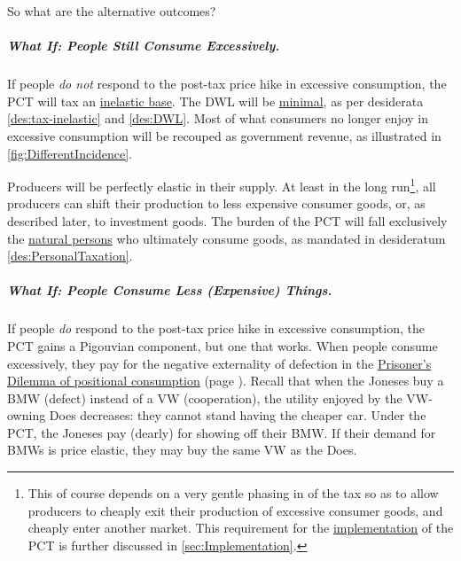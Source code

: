 So what are the alternative outcomes?

\subparagraph{What If: People Still Consume Excessively.} If people \emph{do not} respond to the post-tax price hike in excessive consumption, the PCT will tax an \hyperref[des:tax-inelastic]{inelastic base}. The DWL will be \hyperref[des:DWL]{minimal}, as per desiderata \ref{des:tax-inelastic} and \ref{des:DWL}. Most of what consumers no longer enjoy in excessive consumption will be recouped as government revenue, as illustrated in \autoref{fig:DifferentIncidence}. 

Producers will be perfectly elastic in their supply. At least in the long run\footnote{This of course depends on a very gentle phasing in of the tax so as to allow producers to cheaply exit their production of excessive consumer goods, and cheaply enter another market. This requirement for the \hyperref[sec:Implementation]{implementation} of the PCT is further discussed in \autoref{sec:Implementation}.}, all producers can shift their production to less expensive consumer goods, or, as described later, to investment goods. The burden of the PCT will fall exclusively the \hyperref[des:PersonalTaxation]{natural persons} who ultimately consume goods, as mandated in desideratum \ref{des:PersonalTaxation}.

\subparagraph{What If: People Consume Less (Expensive) Things.} If people \emph{do} respond to the post-tax price hike in excessive consumption, the PCT gains a Pigouvian component, but one that works. When people consume excessively, they pay for the negative externality of defection in the \hyperref[tab:PositionalPD]{Prisoner's Dilemma of positional consumption} (page \pageref{tab:PositionalPD}). Recall that when the Joneses buy a BMW (defect) instead of a VW (cooperation), the utility enjoyed by the VW-owning Does decreases: they cannot stand having the cheaper car. Under the PCT, the Joneses pay (dearly) for showing off their BMW. If their demand for BMWs is price elastic, they may buy the same VW as the Does.

